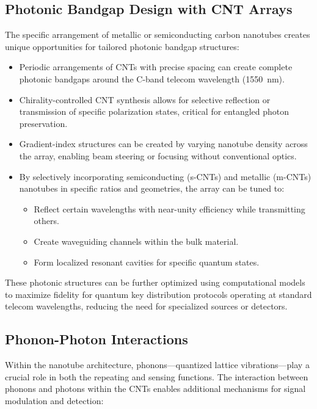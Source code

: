 \documentclass[11pt]{article}
\begin{document}
	\subsection{Photonic Bandgap Design with CNT Arrays}
	The specific arrangement of metallic or semiconducting carbon nanotubes creates unique opportunities for tailored photonic bandgap structures:
	\begin{itemize}
		\item Periodic arrangements of CNTs with precise spacing can create complete photonic bandgaps around the C-band telecom wavelength (\SI{1550}{\nano\meter}).
		\item Chirality-controlled CNT synthesis allows for selective reflection or transmission of specific polarization states, critical for entangled photon preservation.
		\item Gradient-index structures can be created by varying nanotube density across the array, enabling beam steering or focusing without conventional optics.
		\item By selectively incorporating semiconducting (s-CNTs) and metallic (m-CNTs) nanotubes in specific ratios and geometries, the array can be tuned to:
		\begin{itemize}
			\item Reflect certain wavelengths with near-unity efficiency while transmitting others.
			\item Create waveguiding channels within the bulk material.
			\item Form localized resonant cavities for specific quantum states.
		\end{itemize}
	\end{itemize}
	These photonic structures can be further optimized using computational models to maximize fidelity for quantum key distribution protocols operating at standard telecom wavelengths, reducing the need for specialized sources or detectors.
	
	\subsection{Phonon-Photon Interactions}
	Within the nanotube architecture, phonons—quantized lattice vibrations—play a crucial role in both the repeating and sensing functions. The interaction between phonons and photons within the CNTs enables additional mechanisms for signal modulation and detection:
	
\end{document}
